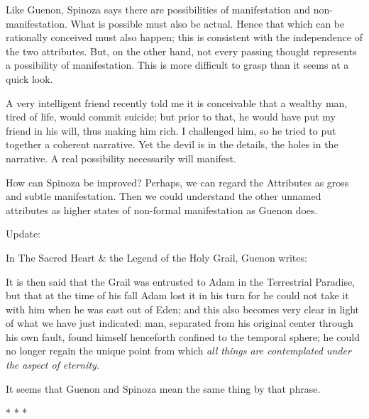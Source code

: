 Like Guenon, Spinoza says there are possibilities of manifestation and non-manifestation. What is possible must also be actual. Hence that which can be rationally conceived must also happen; this is consistent with the independence of the two attributes. But, on the other hand, not every passing thought represents a possibility of manifestation. This is more difficult to grasp than it seems at a quick look.

A very intelligent friend recently told me it is conceivable that a wealthy man, tired of life, would commit suicide; but prior to that, he would have put my friend in his will, thus making him rich. I challenged him, so he tried to put together a coherent narrative. Yet the devil is in the details, the holes in the narrative. A real possibility necessarily will manifest.

How can Spinoza be improved? Perhaps, we can regard the Attributes as gross and subtle manifestation. Then we could understand the other unnamed attributes as higher states of non-formal manifestation as Guenon does.


\hfill

Update:

In The Sacred Heart \& the Legend of the Holy Grail, Guenon writes:

\begin{quotex}
It is then said that the Grail was entrusted to Adam in the Terrestrial Paradise, but that at the time of his fall Adam lost it in his turn for he could not take it with him when he was cast out of Eden; and this also becomes very clear in light of what we have just indicated: man, separated from his original center through his own fault, found himself henceforth confined to the temporal sphere; he could no longer regain the unique point from which \emph{all things are contemplated under the aspect of eternity}. 

\end{quotex}
It seems that Guenon and Spinoza mean the same thing by that phrase.




\begin{center}* * *\end{center}

